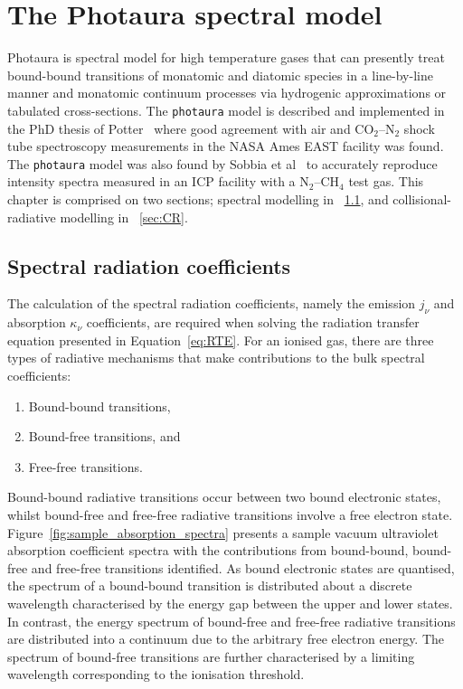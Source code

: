 \chapter{The Photaura spectral model}

Photaura is spectral model for high temperature gases that can presently treat bound-bound transitions of monatomic and diatomic species in a line-by-line manner and monatomic continuum processes via hydrogenic approximations or tabulated cross-sections.
The \texttt{photaura} model is described and implemented in the PhD thesis of Potter~\cite{Potter_PhD} where good agreement with air and CO$_2$--N$_2$ shock tube spectroscopy measurements in the NASA Ames EAST facility was found.  
The \texttt{photaura} model was also found by Sobbia et al~\cite{SLB+2012} to accurately reproduce intensity spectra measured in an ICP facility with a N$_2$--CH$_4$ test gas.
This chapter is comprised on two sections; spectral modelling in \textsection~\ref{sec:spec_rad}, and collisional-radiative modelling in \textsection~\ref{sec:CR}.

\section{Spectral radiation coefficients}
\label{sec:spec_rad}

The calculation of the spectral radiation coefficients, namely the emission $j_\nu$ and absorption $\kappa_\nu$ coefficients, are required when solving the radiation transfer equation presented in Equation~\ref{eq:RTE}.
For an ionised gas, there are three types of radiative mechanisms that make contributions to the bulk spectral coefficients:

\begin{enumerate}
 \item Bound-bound transitions,
 \item Bound-free transitions, and
 \item Free-free transitions.
\end{enumerate}

Bound-bound radiative transitions occur between two bound electronic states, whilst bound-free and free-free radiative transitions involve a free electron state.
Figure~\ref{fig:sample_absorption_spectra} presents a sample vacuum ultraviolet absorption coefficient spectra with the contributions from bound-bound, bound-free and free-free transitions identified.
As bound electronic states are quantised, the spectrum of a bound-bound transition is distributed about a discrete wavelength characterised by the energy gap between the upper and lower states.
In contrast, the energy spectrum of bound-free and free-free radiative transitions are distributed into a continuum due to the arbitrary free electron energy.
The spectrum of bound-free transitions are further characterised by a limiting wavelength corresponding to the ionisation threshold.

